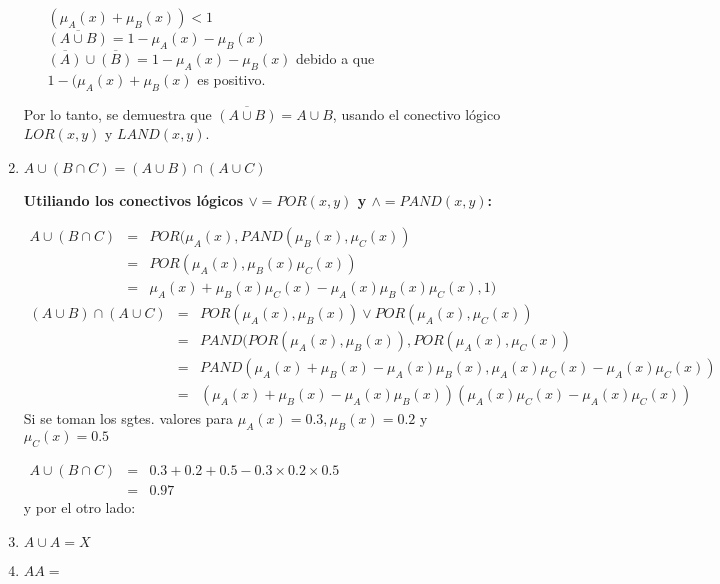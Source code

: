 \documentclass[letterpaper,spanish,11pt]{article}
\begin{document}
\begin{enumerate}
\begin{itemize}
$(\mu_{A}(x) + \mu_{B}(x)) < 1$\\


$\overline{(A \cup B)} = 1-\mu_{A}(x) - \mu_{B}(x)$\\

$\overline{(A)} \cup \overline{(B)}= 1 - \mu_{A}(x) - \mu_{B}(x)$  debido a que $1 - (\mu_{A}(x) + \mu_{B}(x)$ es positivo.

\end{itemize}



Por lo tanto, se demuestra que  $\overline{(A\cup B)}= A \cup B$, usando el
conectivo l\'{o}gico $LOR(x,y)$ y $LAND(x,y)$.\\


\item $A \cup(B \cap C)= (A \cup B) \cap (A \cup C)$

\textbf{Utiliando los conectivos l\'{o}gicos $\vee= POR(x,y)$ y $\wedge=PAND(x,y)$:}

$\begin{array} {lll} A \cup (B \cap C) & = & POR(\mu_{A}(x),PAND(\mu_{B}(x),\mu_{C}(x)) \\ 
& = & POR(\mu_{A}(x), \mu_{B}(x) \mu_{C}(x)) \\ & = & \mu_{A}(x) + \mu_{B}(x) \mu_{C}(x) - \mu_{A}(x)\mu_{B}(x)\mu_{C}(x), 1)\end{array}$\\

$\begin{array} {lll} (A \cup B) \cap (A \cup C) & = & POR(\mu_{A}(x), \mu_{B}(x)) \vee POR(\mu_{A}(x),\mu_{C}(x)) \\ 
& = & PAND(POR(\mu_{A}(x), \mu_{B}(x)), POR(\mu_{A}(x), \mu_{C}(x)) \\ 
& = & PAND(\mu_{A}(x) + \mu_{B}(x) -\mu_{A}(x)\mu_{B}(x), \mu_{A}(x)\mu_{C}(x)-\mu_{A}(x)\mu_{C}(x))\\
& = & (\mu_{A}(x) + \mu_{B}(x) -\mu_{A}(x)\mu_{B}(x))  (\mu_{A}(x)\mu_{C}(x)-\mu_{A}(x)\mu_{C}(x))
\end{array}$\\

Si se toman los sgtes. valores para $\mu_{A}(x)=0.3, \mu_{B}(x)=0.2 $ y $\mu_{C}(x)=0.5$

$\begin{array} {lll} A \cup (B \cap C) & = & 0.3 + 0.2 +0.5 - 0.3\times  0.2 \times 0.5  \\ 
& = & 0.97\end{array}$\\

y por el otro lado:



\item $A \cup A = X$
\item $A A= $
\end{enumerate}
\end{document}
